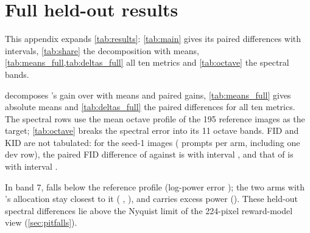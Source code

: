 
\clearpage

\section{Full held-out results}\label{app:full}

This appendix expands \cref{tab:results}: \cref{tab:main} gives its paired differences with intervals, \cref{tab:share} the decomposition with means, \cref{tab:means_full,tab:deltas_full} all ten metrics and \cref{tab:octave} the spectral bands.

\begin{table}[!htbp]
\centering
\caption{\textbf{Paired held-out differences (expands \cref{tab:results}).} Held-out paired differences against \segaofficial{} (rows 8--194, seed 0, $n=\N{ho@nprompts}$); the first row gives the absolute means of \segaofficial. Each cell shows the mean difference and its nominal 95\% bootstrap interval; \better{}/\worse{} mark intervals that exclude zero in the better or worse direction; unmarked cells are ties. A star marks a Holm-adjusted $p\le0.05$ across this table's paired comparisons, using approximate centered-bootstrap tests.  has all ten metrics and a separate Holm family. Key result: base and temperature carry most of \sega's gain, and no per-band law beats it.}
\label{tab:main}
\footnotesize
\setlength{\tabcolsep}{3.1pt}

\end{table}

 decomposes \sega's gain over \ntk{} with means and paired gains, \cref{tab:means_full} gives absolute means and \cref{tab:deltas_full} the paired differences for all ten metrics. The spectral rows use the mean octave profile of the 195 \afk{} reference images as the target; \cref{tab:octave} breaks the spectral error into its 11 octave bands. FID and KID are not tabulated: for the seed-1 images ( prompts per arm, including one dev row), the paired FID difference of \tempsb{} against \segaofficial{} is  with interval , and that of \constancytm{} is  with interval .

In band 7, \ntk{} falls below the reference profile (log-power error ); the two arms with \sega's allocation stay closest to it (\segaofficial{} , \segactm{} ), and \tempsb{} carries excess power (). These held-out spectral differences lie above the Nyquist limit of the 224-pixel reward-model view (\cref{sec:pitfalls}).

